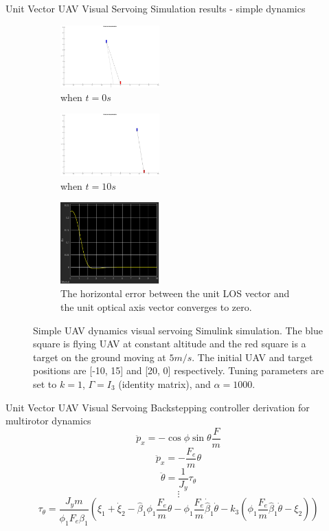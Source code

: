 \documentclass[9pt]{beamer}
\begin{document}
\begin{frame}{Unit Vector UAV Visual Servoing}
Simulation results - simple dynamics
\begin{figure}[htbp]
	\centering
	\begin{subfigure}[t]{0.32\linewidth}
		\includegraphics[width=1.5in]{chapter4/simple_zero}
		\caption{when $t=0s$}
	\end{subfigure}
	\begin{subfigure}[t]{0.32\linewidth}
		\includegraphics[width=1.5in]{chapter4/simple_ten}
		\caption{when $t=10s$}
	\end{subfigure}
	\begin{subfigure}[t]{0.32\linewidth}
		\centering
		\includegraphics[width=1.5in]{chapter4/simple_ex}
		\caption{The horizontal error between the unit LOS vector and the unit optical axis vector converges to zero.}
	\end{subfigure}	
	\caption{Simple UAV dynamics visual servoing Simulink simulation. The blue square is flying UAV at constant altitude and the red square is a target on the ground moving at $5m/s$. The initial UAV and target positions are [-10, 15] and [20, 0] respectively. Tuning parameters are set to $k=1$, $\Gamma=I_3$ (identity matrix), and $\alpha=1000$.}
	\label{simple_simulation}
\end{figure}
\end{frame}

\begin{frame}{Unit Vector UAV Visual Servoing}
Backstepping controller derivation for multirotor dynamics
$$\ddot{p}_x=-\cos\phi\sin\theta\frac{F}{m}$$
$$\ddot{p}_x=-\frac{F_e}{m}\theta$$
$$\ddot{\theta}=\frac{1}{J_y}\tau_{\theta}$$
$$\vdots$$
$$\tau_\theta=\frac{J_ym}{\phi_1F_e\hat{\beta}_1}
(\xi_1+\dot{\xi}_2-\hat{\beta}_1\phi_1\frac{F_e}{m}\theta-\phi_1\frac{F_e}{m}\dot{\hat{\beta}}_1\dot{\theta}-k_3(\phi_1\frac{F_e}{m}\hat{\beta}_1\dot{\theta}-\xi_2))$$
\end{frame}
\end{document}
